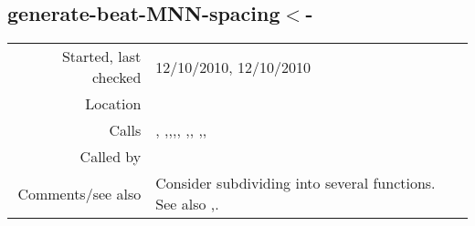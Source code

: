 \subsection*{generate-beat-MNN-spacing$<$-}\label{fun:generate-beat-MNN-spacing<-}

\vspace{0.3cm}
\begin{tabular}{r|p{8cm}}
Started, last checked & 12/10/2010, 12/10/2010 \\
Location & \nameref{sec:generating-beat-MNN-spacing-backwards} \\
Calls & \nameref{fun:checklist<-p}, \nameref{fun:choose-one},\newline \nameref{fun:choose-one-with-beat},\newline \nameref{fun:geom-mean-likelihood-of-states<-},\newline \nameref{fun:index-1st-sublist-item>=}, \nameref{fun:my-last},\newline \nameref{fun:segments-strict}, \nameref{fun:sort-dataset-asc},\newline \nameref{fun:states2datapoints-by-lookup<-},\newline \nameref{fun:translate-datapoints-to-last-ontime} \\
Called by & \\
Comments/see also & Consider subdividing into several functions. See also \nameref{fun:generate-beat-MNN-spacing->},\newline \nameref{fun:generate-beat-spacing-forcing<-}.
\end{tabular}

